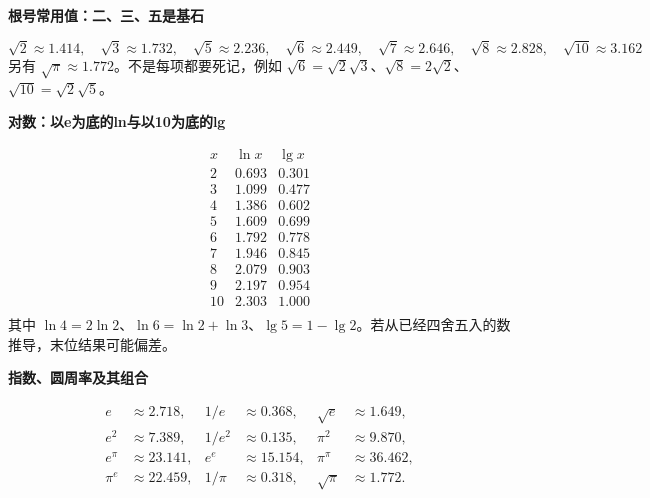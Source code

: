 \clearpage
\begin{explanationbox}
\textbf{\textcolor{CExplanation}{根号常用值：二、三、五是基石}}
\par\medskip
\begin{center}

\end{center}
\medskip
\[\sqrt{2}\approx1.414,\quad \sqrt{3}\approx1.732,\quad \sqrt{5}\approx2.236,\quad \sqrt{6}\approx2.449,\quad \sqrt{7}\approx2.646,\quad \sqrt{8}\approx2.828,\quad \sqrt{10}\approx3.162\]另有 $\sqrt\pi\approx1.772$。不是每项都要死记，例如 $\sqrt6=\sqrt2\sqrt3$、$\sqrt8=2\sqrt2$、$\sqrt{10}=\sqrt2\sqrt5$。
\end{explanationbox}
\clearpage
\begin{explanationbox}
\textbf{\textcolor{CExplanation}{对数：以e为底的ln与以10为底的lg}}
\par\medskip
\begin{center}

\end{center}
\medskip
\[\begin{array}{c|c|c}
x & \ln x & \lg x\\\hline
2 & 0.693 & 0.301\\
3 & 1.099 & 0.477\\
4 & 1.386 & 0.602\\
5 & 1.609 & 0.699\\
6 & 1.792 & 0.778\\
7 & 1.946 & 0.845\\
8 & 2.079 & 0.903\\
9 & 2.197 & 0.954\\
10 & 2.303 & 1.000\\\end{array}\]其中 $\ln4=2\ln2$、$\ln6=\ln2+\ln3$、$\lg5=1-\lg2$。若从已经四舍五入的数推导，末位结果可能偏差。
\end{explanationbox}
\clearpage
\begin{explanationbox}
\textbf{\textcolor{CExplanation}{指数、圆周率及其组合}}
\par\medskip
\begin{center}

\end{center}
\medskip
\[\begin{aligned}e&\approx2.718, &1/e&\approx0.368, &\sqrt e&\approx1.649,\\ e^2&\approx7.389,&1/e^2&\approx0.135, &\pi^2&\approx9.870,\\ e^\pi&\approx23.141,&e^e&\approx15.154,&\pi^\pi&\approx36.462,\\ \pi^e&\approx22.459,&1/\pi&\approx0.318,&\sqrt\pi&\approx1.772.\end{aligned}\]
\end{explanationbox}
